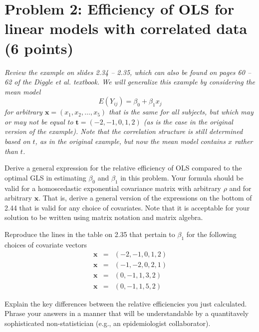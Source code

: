 \documentclass[11pt, letterpaper]{article}
\newcommand{\bx}{{\bm x}}
\newcommand{\beas}{\begin{eqnarray*}}
\newcommand{\eeas}{\end{eqnarray*}}
\begin{document}
\section*{Problem 2: Efficiency of OLS for linear models with correlated data (6 points)}
{\em Review the example on slides 2.34 -- 2.35, which can also be found on pages 60 -- 62 of the Diggle et al. textbook.  We will generalize this example by considering the mean model
\[
E(Y_{ij}) = \beta_0 + \beta_1 x_j
\]
for arbitrary $\bx = (x_1,x_2,\ldots,x_5)$ that is the same for all subjects, but which may or may not
be equal to ${\bm t}=(-2,-1,0,1,2)$ (as is the case in the original version of the example).
Note that the correlation structure is still determined based on $t$, as in the original example, but now the mean model contains $x$ rather than $t$.}
\begin{enumerate}[(a)]
{\em \item Derive a general expression for the relative efficiency of OLS compared to the optimal GLS in estimating $\beta_0$ and $\beta_1$ in this problem.  Your formula should be valid for a homoscedastic exponential covariance matrix with arbitrary
$\rho$ and for arbitrary $\bx$.  That is, derive a general version of the expressions
on the bottom of 2.44 that is valid for any choice of covariates.  Note that it is acceptable for your solution to be written using matrix notation and matrix algebra.}
{\em \item Reproduce the lines in the table on 2.35 that pertain to $\beta_1$ for the following choices of covariate vectors
\beas
\bx&=&(-2,-1,0,1,2)\\
\bx&=&(-1,-2,0,2,1)\\
\bx&=&(0,-1,1,3,2)\\
\bx&=&(0,-1,1,5,2)
\eeas}
{\em \item Explain the key differences between the relative efficiencies you just calculated.  Phrase your answers in a manner that will be understandable by
a quantitavely sophisticated non-statistician (e.g., an epidemiologist collaborator).
}
\end{enumerate} 
\end{document}
